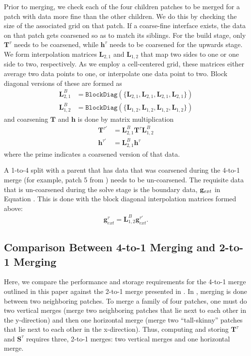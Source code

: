 Prior to merging, we check each of the four children patches to be merged for a patch with data more fine than the other children. We do this by checking the size of the associated grid on that patch. If a coarse-fine interface exists, the data on that patch gets coarsened so as to match its siblings. For the build stage, only $\mathbf{T}^{\tau}$ needs to be coarsened, while $\textbf{h}^{\tau}$ needs to be coarsened for the upwards stage. We form interpolation matrices $\textbf{L}_{2,1}$ and $\textbf{L}_{1,2}$ that map two sides to one or one side to two, respectively. As we employ a cell-centered grid, these matrices either average two data points to one, or interpolate one data point to two. Block diagonal versions of these are formed as
\begin{align}
    \textbf{L}_{2,1}^{B} &= \texttt{BlockDiag}(\{\textbf{L}_{2,1}, \textbf{L}_{2,1}, \textbf{L}_{2,1}, \textbf{L}_{2,1}\}) \\
    \textbf{L}_{1,2}^{B} &= \texttt{BlockDiag}(\{\textbf{L}_{1,2}, \textbf{L}_{1,2}, \textbf{L}_{1,2}, \textbf{L}_{1,2}\})
\end{align}
and coarsening $\textbf{T}$ and $\textbf{h}$ is done by matrix multiplication
\begin{align}
    \textbf{T}^{\tau'} &= \textbf{L}_{2,1}^{B} \textbf{T}^{\tau} \textbf{L}_{1,2}^{B} \\
    \textbf{h}^{\tau'} &= \textbf{L}_{2,1}^{B} \textbf{h}^{\tau}
\end{align}
where the prime indicates a coarsened version of that data.

A 1-to-4 split with a parent that has data that was coarsened during the 4-to-1 merge (for example, patch 5 from ) needs to be un-coarsened. The requisite data that is un-coarsened during the solve stage is the boundary data, $\mathbf g_{ext}$ in Equation . This is done with the block diagonal interpolation matrices formed above:
\begin{align}
    \textbf{g}^{\tau}_{ext} = \textbf{L}_{1,2}^{B} \textbf{g}^{\tau'}_{ext}.
\end{align}

\subsection{Comparison Between 4-to-1 Merging and 2-to-1 Merging}
\label{sub:comparison_between_4t1_and2t1_merging}

Here, we compare the performance and storage requirements for the 4-to-1 merge outlined in this paper against the 2-to-1 merge presented in \citep{gillman2014direct}. In \citep{gillman2014direct}, merging is done between two neighboring patches. To merge a family of four patches, one must do two vertical merges (merge two neighboring patches that lie next to each other in the y-direction) and then one horizontal merge (merge two ``tall-skinny'' patches that lie next to each other in the x-direction). Thus, computing and storing $\textbf{T}^{\tau}$ and $\mathbf{S}^{\tau}$ requires three, 2-to-1 merges: two vertical merges and one horizontal merge.

